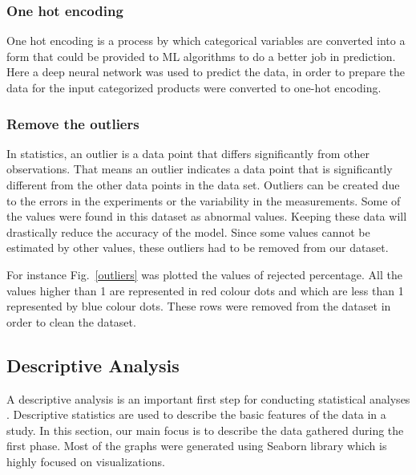 \subsubsection {One hot encoding}
One hot encoding is a process by which categorical variables are converted into a form that could be provided to ML algorithms to do a better job in prediction. Here a deep neural network was used to predict the data, in order to prepare the data for the input categorized products were converted to one-hot encoding. \\

\subsubsection {Remove the outliers}
In statistics, an outlier is a data point that differs significantly from other observations. That means an outlier indicates a data point that is significantly different from the other data points in the data set. Outliers can be created due to the errors in the experiments or the variability in the measurements.
Some of the values were found in this dataset as abnormal values. Keeping these data will drastically reduce the accuracy of the model. Since some values cannot be estimated by other values, these outliers had to be removed from our dataset. 


For instance Fig.~\ref{outliers}  was plotted the values of rejected percentage. All the values higher than 1 are represented in red colour dots and which are less than 1 represented by blue colour dots. These rows were removed from the dataset in order to clean the dataset. 



\subsection {Descriptive Analysis}


A descriptive analysis is an important first step for conducting statistical analyses \cite{jain2000statistical}. Descriptive statistics are used to describe the basic features of the data in a study.  In this section, our main focus is to describe the data gathered during the first phase. Most of the graphs were generated using Seaborn \cite{seaborn} library which is highly focused on visualizations. 

